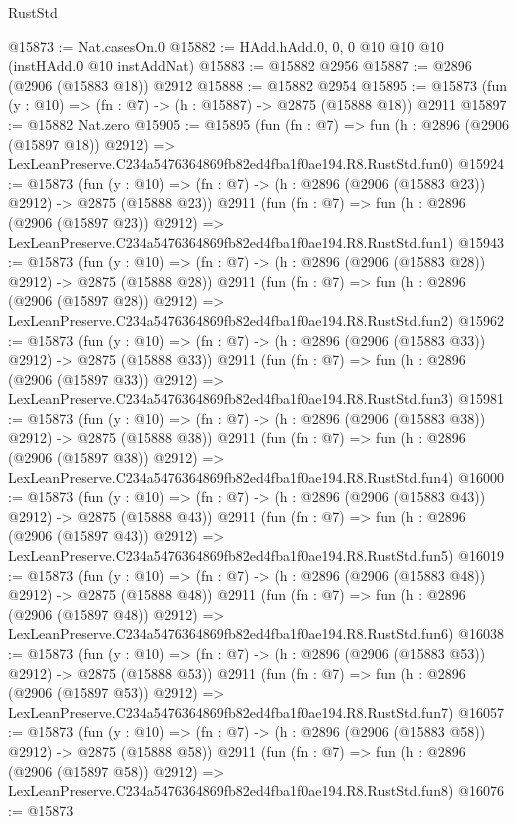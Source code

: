 \begin{lexlean}{RustStd}
\begin{coremodule}
@15873 := Nat.casesOn.{0}
@15882 := HAdd.hAdd.{0, 0, 0} @10 @10 @10 (instHAdd.{0} @10 instAddNat)
@15883 := @15882 @2956
@15887 := @2896 (@2906 (@15883 @18)) @2912
@15888 := @15882 @2954
@15895 := @15873 (fun (y : @10) => (fn : @7) -> (h : @15887) -> @2875 (@15888 @18)) @2911
@15897 := @15882 Nat.zero
@15905 := @15895
    (fun (fn : @7) =>
    fun (h : @2896 (@2906 (@15897 @18)) @2912) =>
    LexLeanPreserve.C234a5476364869fb82ed4fba1f0ae194.R8.RustStd.fun0)
@15924 := @15873
    (fun (y : @10) => (fn : @7) -> (h : @2896 (@2906 (@15883 @23)) @2912) -> @2875 (@15888 @23))
    @2911
    (fun (fn : @7) =>
    fun (h : @2896 (@2906 (@15897 @23)) @2912) =>
    LexLeanPreserve.C234a5476364869fb82ed4fba1f0ae194.R8.RustStd.fun1)
@15943 := @15873
    (fun (y : @10) => (fn : @7) -> (h : @2896 (@2906 (@15883 @28)) @2912) -> @2875 (@15888 @28))
    @2911
    (fun (fn : @7) =>
    fun (h : @2896 (@2906 (@15897 @28)) @2912) =>
    LexLeanPreserve.C234a5476364869fb82ed4fba1f0ae194.R8.RustStd.fun2)
@15962 := @15873
    (fun (y : @10) => (fn : @7) -> (h : @2896 (@2906 (@15883 @33)) @2912) -> @2875 (@15888 @33))
    @2911
    (fun (fn : @7) =>
    fun (h : @2896 (@2906 (@15897 @33)) @2912) =>
    LexLeanPreserve.C234a5476364869fb82ed4fba1f0ae194.R8.RustStd.fun3)
@15981 := @15873
    (fun (y : @10) => (fn : @7) -> (h : @2896 (@2906 (@15883 @38)) @2912) -> @2875 (@15888 @38))
    @2911
    (fun (fn : @7) =>
    fun (h : @2896 (@2906 (@15897 @38)) @2912) =>
    LexLeanPreserve.C234a5476364869fb82ed4fba1f0ae194.R8.RustStd.fun4)
@16000 := @15873
    (fun (y : @10) => (fn : @7) -> (h : @2896 (@2906 (@15883 @43)) @2912) -> @2875 (@15888 @43))
    @2911
    (fun (fn : @7) =>
    fun (h : @2896 (@2906 (@15897 @43)) @2912) =>
    LexLeanPreserve.C234a5476364869fb82ed4fba1f0ae194.R8.RustStd.fun5)
@16019 := @15873
    (fun (y : @10) => (fn : @7) -> (h : @2896 (@2906 (@15883 @48)) @2912) -> @2875 (@15888 @48))
    @2911
    (fun (fn : @7) =>
    fun (h : @2896 (@2906 (@15897 @48)) @2912) =>
    LexLeanPreserve.C234a5476364869fb82ed4fba1f0ae194.R8.RustStd.fun6)
@16038 := @15873
    (fun (y : @10) => (fn : @7) -> (h : @2896 (@2906 (@15883 @53)) @2912) -> @2875 (@15888 @53))
    @2911
    (fun (fn : @7) =>
    fun (h : @2896 (@2906 (@15897 @53)) @2912) =>
    LexLeanPreserve.C234a5476364869fb82ed4fba1f0ae194.R8.RustStd.fun7)
@16057 := @15873
    (fun (y : @10) => (fn : @7) -> (h : @2896 (@2906 (@15883 @58)) @2912) -> @2875 (@15888 @58))
    @2911
    (fun (fn : @7) =>
    fun (h : @2896 (@2906 (@15897 @58)) @2912) =>
    LexLeanPreserve.C234a5476364869fb82ed4fba1f0ae194.R8.RustStd.fun8)
@16076 := @15873

\end{coremodule}
\end{lexlean}

